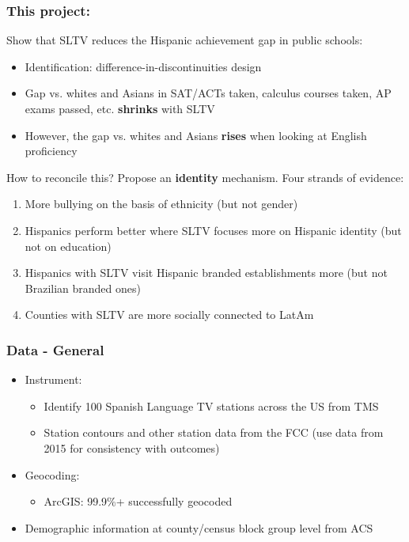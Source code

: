 \documentclass{beamer}
\begin{document}
\begin{frame}
\frametitle{This project:}

Show that SLTV reduces the Hispanic achievement gap in public schools:
\begin{itemize}
\item Identification: difference-in-discontinuities design
\item Gap vs. whites and Asians in SAT/ACTs taken, calculus courses taken, AP exams passed, etc. \textbf{shrinks} with SLTV
\item However, the gap vs. whites and Asians \textbf{rises} when looking at English proficiency
\end{itemize}

How to reconcile this?
\pause 
Propose an \textbf{identity} mechanism. Four strands of evidence:

\begin{enumerate}
\item More bullying on the basis of ethnicity (but not gender)

\item Hispanics perform better where SLTV focuses more on Hispanic identity (but not on education)

\item Hispanics with SLTV visit Hispanic branded establishments more (but not Brazilian branded ones)

\item Counties with SLTV are more socially connected to LatAm
\end{enumerate}

\end{frame}


\begin{frame}
\frametitle{Data - General}


\begin{itemize}
\item Instrument:
\begin{itemize}
\item Identify 100 Spanish Language TV stations across the US from TMS
\item Station contours and other station data from the FCC (use data from 2015 for consistency with outcomes)
\end{itemize}
\item Geocoding:
\begin{itemize}
\item ArcGIS: 99.9\%+ successfully geocoded
\end{itemize}
\item Demographic information at county/census block group level from ACS
\end{itemize}

\end{frame}
\end{document}
